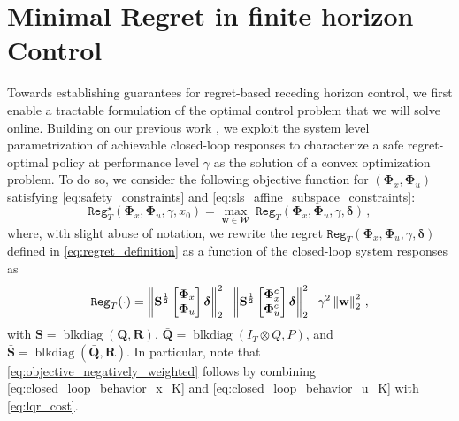 \documentclass[conference]{IEEEtran}
\newcommand{\norm}[1]{\left\lVert#1\right\rVert}
\begin{document}
\section{Minimal Regret in finite horizon Control}
\label{sec:finite_horizon}
Towards establishing guarantees for regret-based receding horizon control, we first enable a tractable formulation of the optimal control problem that we will solve online. %
Building on our previous work \cite{martin2022safe}, we exploit the system level parametrization of achievable closed-loop responses to characterize a safe regret-optimal policy at performance level $\gamma$ as the solution of a convex optimization problem.
To do so, we consider the following objective function for $(\bm{\Phi}_x, \bm{\Phi}_u)$ satisfying \eqref{eq:safety_constraints} and \eqref{eq:sls_affine_subspace_constraints}:
\begin{equation}
    \label{eq:objective_maximization}
    \mathtt{Reg}_T^\star(\bm{\Phi}_x, \bm{\Phi}_u, \gamma, x_0) =
    \max_{\mathbf{w} \in \mathbfcal{W}} ~ \mathtt{Reg}_T(\bm{\Phi}_x, \bm{\Phi}_u, \gamma, \bm{\delta})\,,
\end{equation}
where,  with slight abuse of notation, we rewrite the regret $\mathtt{Reg}_T(\bm{\Phi}_x, \bm{\Phi}_u, \gamma, \bm{\delta})$ defined in \eqref{eq:regret_definition} as a function of the closed-loop system responses as
\begin{align}
    \mathtt{Reg}_T(\cdot) %
    = \norm{\bar{\mathbf{S}}^{\frac{1}{2}} \begin{bmatrix}
        \bm{\Phi}_x \\ \bm{\Phi}_u
    \end{bmatrix} \bm{\delta}}_2^2  \hspace{-.15cm} - \hspace{-.01cm}
    \norm{\mathbf{S}^{\frac{1}{2}} \begin{bmatrix}
        \bm{\Phi}_x^c \\ \bm{\Phi}_u^c
    \end{bmatrix} \bm{\delta}}_2^2 \hspace{-.15cm} -\gamma^2\norm{\mathbf{w}}_2^2\,,\label{eq:objective_negatively_weighted}
\end{align}
with $\mathbf{S} = \operatorname{blkdiag}(\mathbf{Q}, \mathbf{R})$, $\bar{\mathbf{Q}} = \operatorname{blkdiag}(I_T \otimes Q, P)$, and $\bar{\mathbf{S}} = \operatorname{blkdiag}(\bar{\mathbf{Q}}, \mathbf{R})$. In particular, note that \eqref{eq:objective_negatively_weighted} follows by combining \eqref{eq:closed_loop_behavior_x_K} and \eqref{eq:closed_loop_behavior_u_K} with \eqref{eq:lqr_cost}.
\end{document}
